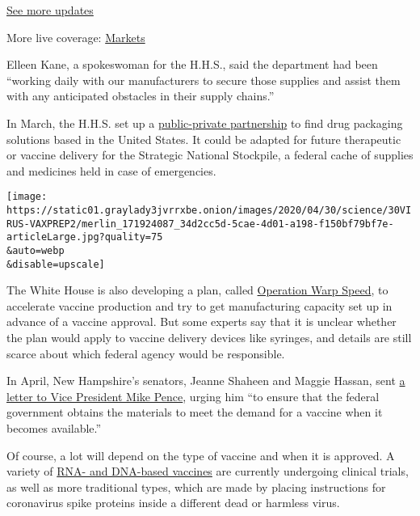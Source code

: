 \href{https://www.nytimes3xbfgragh.onion/2020/09/09/world/covid-19-coronavirus.html?action=click\&pgtype=Article\&state=default\&region=MAIN_CONTENT_1\&context=storylines_live_updates}{See
more updates}

More live coverage:
\href{https://www.nytimes3xbfgragh.onion/live/2020/09/08/business/stock-market-today-coronavirus?action=click\&pgtype=Article\&state=default\&region=MAIN_CONTENT_1\&context=storylines_live_updates}{Markets}

Elleen Kane, a spokeswoman for the H.H.S., said the department had been
``working daily with our manufacturers to secure those supplies and
assist them with any anticipated obstacles in their supply chains.''

In March, the H.H.S. set up a
\href{https://www.hhs.gov/about/news/2020/03/18/hhs-announces-new-public-private-partnership-to-develop-us-based-high-speed-emergency-drug-packaging-solutions.html}{public-private
partnership} to find drug packaging solutions based in the United
States. It could be adapted for future therapeutic or vaccine delivery
for the Strategic National Stockpile, a federal cache of supplies and
medicines held in case of emergencies.

\texttt{[image: https://static01.graylady3jvrrxbe.onion/images/2020/04/30/science/30VIRUS-VAXPREP2/merlin\_171924087\_34d2cc5d-5cae-4d01-a198-f150bf79bf7e-articleLarge.jpg?quality=75\\\&auto=webp\\\&disable=upscale]}

The White House is also developing a plan, called
\href{https://www.nytimes3xbfgragh.onion/2020/04/29/us/politics/trump-coronavirus-vaccine-operation-warp-speed.html}{Operation
Warp Speed}, to accelerate vaccine production and try to get
manufacturing capacity set up in advance of a vaccine approval. But some
experts say that it is unclear whether the plan would apply to vaccine
delivery devices like syringes, and details are still scarce about which
federal agency would be responsible.

In April, New Hampshire's senators, Jeanne Shaheen and Maggie Hassan,
sent
\href{https://www.shaheen.senate.gov/imo/media/doc/2020-04-21\%20Letter\%20to\%20VP\%20Pence\%20on\%20Vaccine\%20Materials\%20-\%20Shaheen\%20\&\%20Hassan.pdf}{a
letter to Vice President Mike Pence}, urging him ``to ensure that the
federal government obtains the materials to meet the demand for a
vaccine when it becomes available.''

Of course, a lot will depend on the type of vaccine and when it is
approved. A variety of
\href{https://www.nytimes3xbfgragh.onion/2020/03/16/health/coronavirus-vaccine.html}{RNA-
and DNA-based vaccines} are currently undergoing clinical trials, as
well as more traditional types, which are made by placing instructions
for coronavirus spike proteins inside a different dead or harmless
virus.

